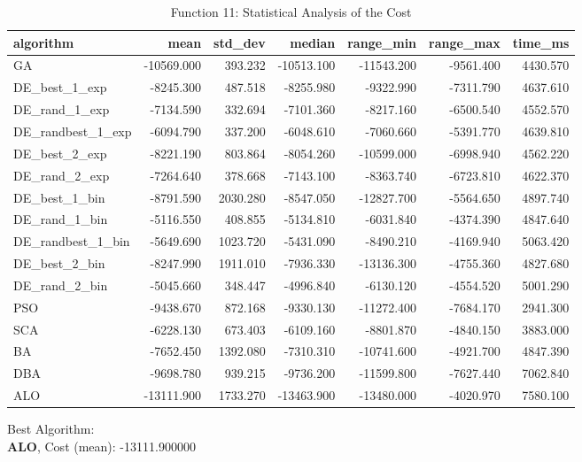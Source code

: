 \documentclass[12pt]{article}
\begin{document}
\begin{table}[H]
    \centering
    \footnotesize
    \begin{adjustbox}{width=1\textwidth}
        \begin{tabular}{lrrrrrr}
            \toprule
            algorithm &       mean &  std\_dev &     median &  range\_min &  range\_max &  time\_ms \\
            \midrule
            GA & -10569.000 & 393.232 & -10513.100 & -11543.200 & -9561.400 & 4430.570 \\
            DE\_best\_1\_exp & -8245.300 & 487.518 & -8255.980 & -9322.990 & -7311.790 & 4637.610 \\
            DE\_rand\_1\_exp & -7134.590 & 332.694 & -7101.360 & -8217.160 & -6500.540 & 4552.570 \\
            DE\_randbest\_1\_exp & -6094.790 & 337.200 & -6048.610 & -7060.660 & -5391.770 & 4639.810 \\
            DE\_best\_2\_exp & -8221.190 & 803.864 & -8054.260 & -10599.000 & -6998.940 & 4562.220 \\
            DE\_rand\_2\_exp & -7264.640 & 378.668 & -7143.100 & -8363.740 & -6723.810 & 4622.370 \\
            DE\_best\_1\_bin & -8791.590 & 2030.280 & -8547.050 & -12827.700 & -5564.650 & 4897.740 \\
            DE\_rand\_1\_bin & -5116.550 & 408.855 & -5134.810 & -6031.840 & -4374.390 & 4847.640 \\
            DE\_randbest\_1\_bin & -5649.690 & 1023.720 & -5431.090 & -8490.210 & -4169.940 & 5063.420 \\
            DE\_best\_2\_bin & -8247.990 & 1911.010 & -7936.330 & -13136.300 & -4755.360 & 4827.680 \\
            DE\_rand\_2\_bin & -5045.660 & 348.447 & -4996.840 & -6130.120 & -4554.520 & 5001.290 \\
            PSO & -9438.670 & 872.168 & -9330.130 & -11272.400 & -7684.170 & 2941.300 \\
            SCA & -6228.130 & 673.403 & -6109.160 & -8801.870 & -4840.150 & 3883.000 \\
            BA & -7652.450 & 1392.080 & -7310.310 & -10741.600 & -4921.700 & 4847.390 \\
            DBA & -9698.780 & 939.215 & -9736.200 & -11599.800 & -7627.440 & 7062.840 \\
            ALO & -13111.900 & 1733.270 & -13463.900 & -13480.000 & -4020.970 & 7580.100 \\
            \bottomrule
        \end{tabular}
        
        
    \end{adjustbox}
    \caption{Function 11: Statistical Analysis of the Cost} 
\end{table}
Best Algorithm: \\
\textbf{ALO}, Cost (mean): -13111.900000\\
\newpage
\end{document}
